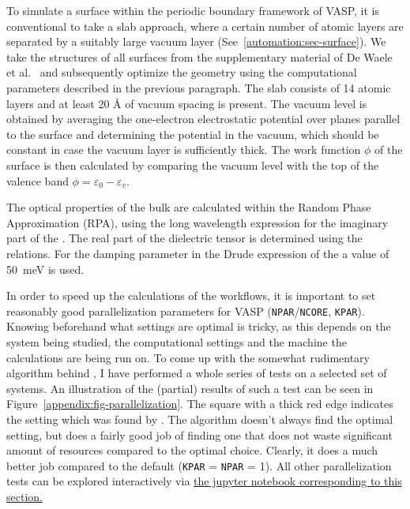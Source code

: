 \begin{refsection}
To simulate a surface within the periodic boundary framework of \gls{VASP}, it is 
conventional to take a slab approach, where a certain number of atomic layers 
are separated by a suitably large vacuum layer (See~\ref{automation:sec-surface}).
We take the structures of all surfaces from the 
supplementary material of De Waele et al.~\cite{DeWaele2016} and subsequently 
optimize the geometry using the computational parameters described in the 
previous paragraph. The slab consists of 14 atomic layers and at least 20 
\si{\angstrom} of vacuum spacing is present. The vacuum level is obtained by 
averaging the one-electron electrostatic potential over planes parallel to the 
surface and determining the potential in the vacuum, which should be constant 
in case the vacuum layer is sufficiently thick. The work function $\phi$ of 
the surface is then calculated by comparing the vacuum level with the top of 
the valence band $\phi = \varepsilon_0 - \varepsilon_v$. 

The optical properties of the bulk are calculated within the Random Phase 
Approximation (RPA), using the long wavelength expression for the imaginary 
part of the . The real part of the dielectric tensor is 
determined using the  relations. For the damping parameter in 
the Drude expression of the  a value of 50~\si{\milli\electronvolt} is used.

\pagebreak[4]

In order to speed up the calculations of the workflows, it is important to set 
reasonably good parallelization parameters for \gls{VASP} 
(\texttt{NPAR}/\texttt{NCORE}, \texttt{KPAR}). Knowing beforehand what settings 
are optimal is tricky, as this depends on the system being studied, the 
computational settings and the machine the calculations are being run on. To 
come up with the somewhat rudimentary algorithm behind 
,
I have performed a whole series of tests on a selected set of systems. An 
illustration of the (partial) results of such a test can be seen in 
Figure~\ref{appendix:fig-parallelization}. The square with a thick red edge indicates the setting 
which was found by
. 
The algorithm doesn't always find the optimal setting, but does a fairly good 
job of finding one that does not waste significant amount of resources compared 
to the optimal choice. Clearly, it does a much better job compared to the default
(\texttt{KPAR} = \texttt{NPAR} = 1). All other parallelization tests can be 
explored interactively via \href{https://mybinder.org/v2/gh/mbercx/jupyter/master?filepath=parallel\%2Fparallel_analysis.ipynb}{the jupyter notebook corresponding 
to this section.}


\end{refsection}
